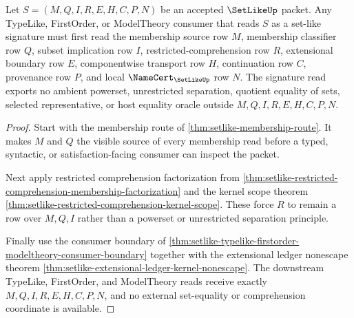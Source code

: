 \begin{theorem}
\label{thm:setlike-typelike-signature-scope}
Let $S=(M,Q,I,R,E,H,C,P,N)$ be an accepted $\SetLikeUp$ packet. Any TypeLike, FirstOrder, or ModelTheory consumer that reads $S$ as a set-like signature must first read the membership source row $M$, membership classifier row $Q$, subset implication row $I$, restricted-comprehension row $R$, extensional boundary row $E$, componentwise transport row $H$, continuation row $C$, provenance row $P$, and local $\NameCert_{\SetLikeUp}$ row $N$. The signature read exports no ambient powerset, unrestricted separation, quotient equality of sets, selected representative, or host equality oracle outside $M,Q,I,R,E,H,C,P,N$.
\end{theorem}
\begin{proof}
Start with the membership route of \autoref{thm:setlike-membership-route}. It makes $M$ and $Q$ the visible source of every membership read before a typed, syntactic, or satisfaction-facing consumer can inspect the packet.

Next apply restricted comprehension factorization from \autoref{thm:setlike-restricted-comprehension-membership-factorization} and the kernel scope theorem \autoref{thm:setlike-restricted-comprehension-kernel-scope}. These force $R$ to remain a row over $M,Q,I$ rather than a powerset or unrestricted separation principle.

Finally use the consumer boundary of \autoref{thm:setlike-typelike-firstorder-modeltheory-consumer-boundary} together with the extensional ledger nonescape theorem \autoref{thm:setlike-extensional-ledger-kernel-nonescape}. The downstream TypeLike, FirstOrder, and ModelTheory reads receive exactly $M,Q,I,R,E,H,C,P,N$, and no external set-equality or comprehension coordinate is available.
\end{proof}

